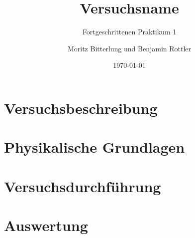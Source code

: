 \documentclass[12pt, a4paper]{scrartcl}
\title{Versuchsname}
\subtitle{Fortgeschrittenen Praktikum 1}
\author{Moritz Bitterlung und Benjamin Rottler}
\date{\today}
\numberwithin{equation}{section}
\begin{document}
\maketitle

\newpage

\tableofcontents

\newpage

\section{Versuchsbeschreibung}

\section{Physikalische Grundlagen}

\section{Versuchsdurchführung}

\section{Auswertung}
\end{document}
